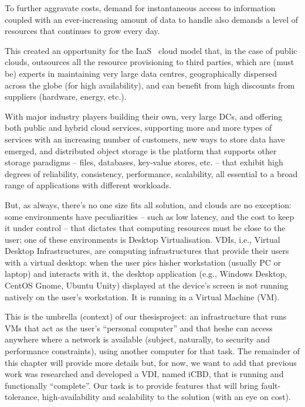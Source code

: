 To further aggravate costs, demand for instantaneous access to information coupled with an ever-increasing amount of data to handle also demands a level of resources that continues to grow every day.

This created an opportunity for the \gls{IaaS}~\cite{Mell2011} cloud model that, in the case of public clouds, outsources all the resource provisioning to third parties, which are (must be) experts in maintaining very large data centres, geographically dispersed across the globe (for high availability), and can benefit from high discounts from suppliers (hardware, energy, etc.).

With major industry players building their own, very large DCs, and offering both public and hybrid cloud services, supporting more and more types of services with an increasing number of customers, new ways to store data have emerged, and distributed object storage is the platform that supports other storage paradigms – files, databases, key-value stores, etc. – that exhibit high degrees of  reliability, consistency, performance, scalability, all essential to a broad range of applications with different workloads.

But, as always, there’s no one size fits all solution, and clouds are no exception: some environments have peculiarities – such as low latency, and the cost to keep it under control – that dictates that computing resources must be close to the user; one of these environments is Desktop Virtualisation.
VDIs, i.e., Virtual Desktop Infrastructures, are computing infrastructures that provide their users with a virtual desktop: when the user pics his\/her workstation (usually PC or laptop) and interacts with it, the desktop application (e.g., Windows Desktop, CentOS Gnome, Ubuntu Unity) displayed at the device’s screen is not running natively on the user’s workstation. It is running in a Virtual Machine (VM).

This is the umbrella (context) of our thesis\/project: an infrastructure that runs VMs that act as the user’s “personal computer” and that he\/she can access anywhere where a network is available (subject, naturally, to security and performance constraints), using another computer for that task. The remainder of this chapter will provide more details but, for now, we want to add that previous work was researched and developed a VDI, named iCBD, that is running and functionally “complete”. Our task is to provide features that will bring fault-tolerance, high-availability and scalability to the solution (with an eye on cost).



